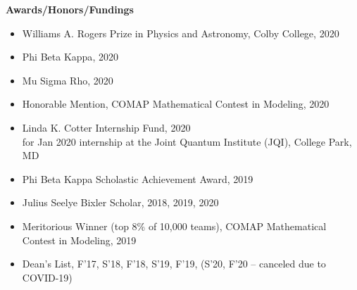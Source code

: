 \documentclass[10pt]{article}
\begin{document}
%
%
%





\noindent \large{\textbf{{Awards/Honors/Fundings}}}  \normalsize \vspace{-5pt} 
\begin{itemize}
	\setlength\itemsep{-4pt}
	\item {Williams A. Rogers Prize in Physics and Astronomy}, Colby College, {2020} 
	\item {Phi Beta Kappa}, {2020} 
	\item {Mu Sigma Rho}, {2020}
	\item {Honorable Mention,}  COMAP Mathematical Contest in Modeling, {2020}
	\item {Linda K. Cotter Internship Fund}, {2020}\\
	      for Jan 2020 internship at the Joint Quantum Institute (JQI), College Park, MD
	\item {Phi Beta Kappa Scholastic Achievement Award,} {2019}
	\item {Julius Seelye Bixler Scholar,} {2018, 2019, 2020}
	\item {Meritorious Winner (top 8\% of 10,000 teams),}  COMAP Mathematical Contest in Modeling, {2019}
	\item {Dean’s List}, {F'17, S'18, F'18, S'19, F'19, (S'20, F'20 -- canceled due to COVID-19)}
\end{itemize}
\end{document}
